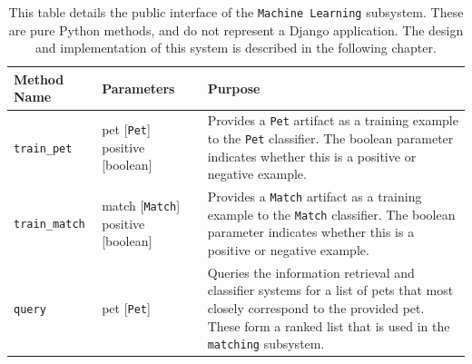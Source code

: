 \begin{table}[htb]
    \caption[Public interface for {\tt Machine Learning} subsystem]{
	This table details the public interface of the {\tt Machine Learning} subsystem.  These are pure Python methods, and do not represent a Django application.  The design and implementation of this system is described in the following chapter.
	}
    \begin{center}
    \begin{tabularx}{ \textwidth}{| l | p{4cm} | X | } 
    \hline
    	Method Name & Parameters & Purpose \\  \hline \hline
		{\tt train_pet} & pet [{\tt Pet}] \newline positive [boolean] & Provides a {\tt Pet} artifact as a training example to the {\tt Pet} classifier.  The boolean parameter indicates whether this is a positive or negative example. \\ \hline
		{\tt train_match} & match [{\tt Match}] \newline positive [boolean] & Provides a {\tt Match} artifact as a training example to the {\tt Match} classifier.  The boolean parameter indicates whether this is a positive or negative example. \\ \hline
		{\tt query} & pet [{\tt Pet}] & Queries the information retrieval and classifier systems for a list of pets that most closely correspond to the provided pet.  These form a ranked list that is used in the {\tt matching} subsystem. \\ \hline		
	 \end{tabularx}
   \\ \rule{0mm}{5mm}

	\end{center}
	 \label{table:ml}
\end{table}